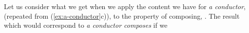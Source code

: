 

Let us consider what we get when we apply the content we have for \textit{a
conductor},  (repeated from (\ref{ex:a-conductor}c)), to the property of composing, .  The
result which would correspond to \textit{a conductor composes} if we
